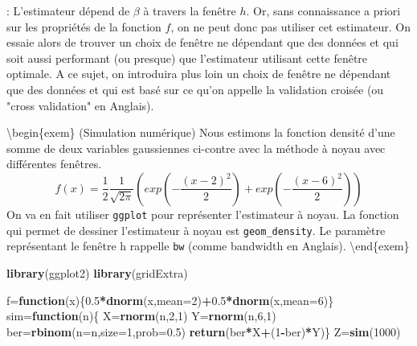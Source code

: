 \documentclass[
]{book}
\newenvironment{Shaded}{\begin{snugshade}}{\end{snugshade}}
\newcommand{\ControlFlowTok}[1]{\textcolor[rgb]{0.13,0.29,0.53}{\textbf{#1}}}
\newcommand{\DataTypeTok}[1]{\textcolor[rgb]{0.13,0.29,0.53}{#1}}
\newcommand{\DecValTok}[1]{\textcolor[rgb]{0.00,0.00,0.81}{#1}}
\newcommand{\FloatTok}[1]{\textcolor[rgb]{0.00,0.00,0.81}{#1}}
\newcommand{\KeywordTok}[1]{\textcolor[rgb]{0.13,0.29,0.53}{\textbf{#1}}}
\newcommand{\NormalTok}[1]{#1}
\newcommand{\OperatorTok}[1]{\textcolor[rgb]{0.81,0.36,0.00}{\textbf{#1}}}
\begin{document}
\begin{cmtr}: L'estimateur dépend de $\beta$ à travers la fenêtre $h$. Or, sans   connaissance a priori sur les propriétés de la fonction $f$, on ne peut donc pas utiliser cet estimateur. On essaie alors de trouver un choix de fenêtre ne dépendant que des données et qui soit aussi performant (ou presque) que l'estimateur utilisant cette fenêtre optimale. A ce sujet, on introduira plus loin un choix de fenêtre ne dépendant que des données et qui est basé sur ce qu'on appelle la validation croisée (ou "cross validation" en Anglais).  \newline
\end{cmtr}

\textbackslash begin\{exem\} (Simulation numérique)
Nous estimons la fonction densité d'une somme de deux variables gaussiennes ci-contre avec la méthode à noyau avec différentes fenêtres.
\[
f(x)=\frac{1}{2}\frac{1}{\sqrt{2\pi}}(exp(-\frac{(x-2)^2}{2})+exp(-\frac{(x-6)^2}{2}))
\]
On va en fait utiliser \texttt{ggplot} pour représenter l'estimateur à noyau. La fonction qui permet de dessiner l'estimateur à noyau est \texttt{geom\_density}. Le paramètre représentant le fenêtre h rappelle \texttt{bw} (comme bandwidth en Anglais).
\textbackslash end\{exem\}

\begin{Shaded}
\begin{Highlighting}[]
\KeywordTok{library}\NormalTok{(ggplot2)}
\KeywordTok{library}\NormalTok{(gridExtra)}

\NormalTok{f=}\ControlFlowTok{function}\NormalTok{(x)\{}\FloatTok{0.5}\OperatorTok{*}\KeywordTok{dnorm}\NormalTok{(x,}\DataTypeTok{mean=}\DecValTok{2}\NormalTok{)}\OperatorTok{+}\FloatTok{0.5}\OperatorTok{*}\KeywordTok{dnorm}\NormalTok{(x,}\DataTypeTok{mean=}\DecValTok{6}\NormalTok{)\}}
\NormalTok{sim=}\ControlFlowTok{function}\NormalTok{(n)\{}
\NormalTok{X=}\KeywordTok{rnorm}\NormalTok{(n,}\DecValTok{2}\NormalTok{,}\DecValTok{1}\NormalTok{)}
\NormalTok{Y=}\KeywordTok{rnorm}\NormalTok{(n,}\DecValTok{6}\NormalTok{,}\DecValTok{1}\NormalTok{)}
\NormalTok{ber=}\KeywordTok{rbinom}\NormalTok{(}\DataTypeTok{n=}\NormalTok{n,}\DataTypeTok{size=}\DecValTok{1}\NormalTok{,}\DataTypeTok{prob=}\FloatTok{0.5}\NormalTok{)}
\KeywordTok{return}\NormalTok{(ber}\OperatorTok{*}\NormalTok{X}\OperatorTok{+}\NormalTok{(}\DecValTok{1}\OperatorTok{-}\NormalTok{ber)}\OperatorTok{*}\NormalTok{Y)\}}
\NormalTok{Z=}\KeywordTok{sim}\NormalTok{(}\DecValTok{1000}\NormalTok{)}
\end{Highlighting}
\end{Shaded}
\end{document}

